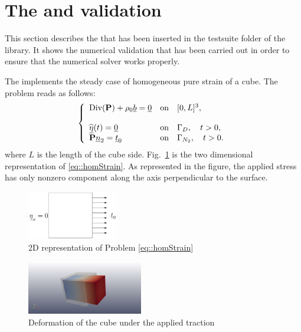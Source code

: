 \section{The \tSS{} and validation}
This section describes the \tSS{} that
has been inserted in the testsuite folder of the library. It shows the
numerical validation that has been carried out in order to ensure that
the numerical solver works properly.

The \tSS{} implements the steady case of homogeneous pure strain of a
cube. The problem reads as follows:
\begin{equation} \left\{
    \begin{array}{lllllll} \displaystyle \text{Div}(\textbf{P}) +
      \rho_0\underline{b} = \underline{0} & \text{on} \quad [0,L]^3,\\ \\
      \widehat{\underline{\eta}}(t)=\underline{0} & \text{on} \quad \Gamma_D, \quad t>0,\\
      \textbf{P}\underline{n}_2=\underline{t}_0 & \text{on} \quad \Gamma_{N_2},
      \quad t>0.\\
    \end{array}\right.
  \label{eq::homStrain}
\end{equation}
where $L$ is the length of the cube
side. Fig.~\ref{fig::pureStrain} is the two dimensional representation
of \eqref{eq::homStrain}. As represented in the figure, the applied
stress has only nonzero component along the axis perpendicular to the
surface.
\begin{figure} \centering
  \includegraphics[width=0.35\textwidth]{images/modelProblem.png}
  \caption{2D representation of Problem \eqref{eq::homStrain}}
  \label{fig::pureStrain}
\end{figure}
\begin{figure} \centering
  \includegraphics[width=0.45\textwidth]{images/cube_exp_timeAdvance-BDF1.png}
  \caption{Deformation of the cube under the applied traction}
  \label{fig:displ}
\end{figure}

